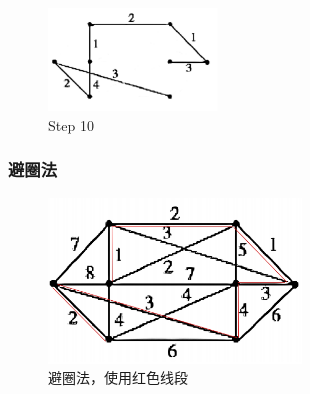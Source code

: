 \begin{figure}[H]
    \centering    
    \includegraphics[width=0.4\textwidth]{./hw9_image/10.png}
    \caption{Step 10}    
    \label{fig:Chapter4_Temporary_Pavilion_1}
\end{figure}
\subsubsection{避圈法}
\begin{figure}[H]
    \centering    
    \includegraphics[width=0.6\textwidth]{./hw9_image/11.png}
    \caption{避圈法，使用红色线段}    
    \label{fig:Chapter4_Temporary_Pavilion_1}
\end{figure}

